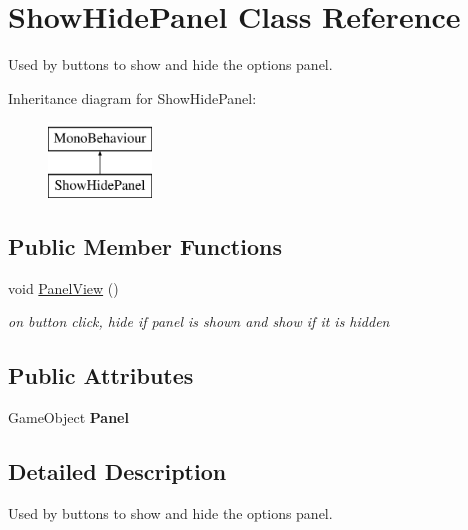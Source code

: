 \hypertarget{class_show_hide_panel}{}\section{Show\+Hide\+Panel Class Reference}
\label{class_show_hide_panel}


Used by buttons to show and hide the options panel.  


Inheritance diagram for Show\+Hide\+Panel\+:\begin{figure}[H]
\begin{center}
\leavevmode
\includegraphics[height=2.000000cm]{class_show_hide_panel}
\end{center}
\end{figure}
\subsection*{Public Member Functions}
\begin{DoxyCompactItemize}
\item 
void \mbox{\hyperlink{class_show_hide_panel_a3a78bdebb7227fbabdef8064e70aa276}{Panel\+View}} ()
\begin{DoxyCompactList}\small\item\em on button click, hide if panel is shown and show if it is hidden \end{DoxyCompactList}\end{DoxyCompactItemize}
\subsection*{Public Attributes}
\begin{DoxyCompactItemize}
\item 
\mbox{\label{class_show_hide_panel_ad6455565c995f75c56454ddf9bb55a6c}} 
Game\+Object {\bfseries Panel}
\end{DoxyCompactItemize}


\subsection{Detailed Description}
Used by buttons to show and hide the options panel. 

